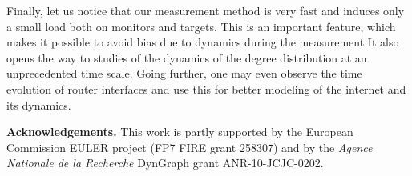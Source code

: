 \documentclass[conference]{IEEEtran}
\begin{document}
Finally, let us notice that our measurement method is very fast and induces only a small load both on monitors and targets. This is an important feature, which makes it possible to avoid bias due to dynamics during the measurement It also opens the way to studies of the dynamics of the degree distribution at an unprecedented time scale. Going further, one may even observe the time evolution of router interfaces and use this for better modeling of the internet and its dynamics.



\medskip
\noindent
{\bf Acknowledgements.}
This work is partly supported by the European Commission EULER project (FP7 FIRE grant 258307) and by the {\em Agence Nationale de la Recherche} DynGraph grant ANR-10-JCJC-0202.



\end{document}
